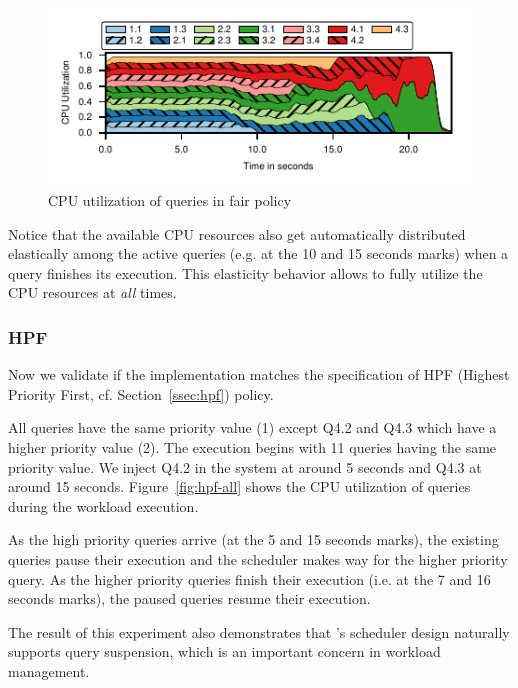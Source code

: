 \begin{figure}[t]
	\centering
	\includegraphics[width=\columnwidth]{figures/ssb-all-uniform-fair-cpu-util.pdf}
	\vspace{-2.5em}
	\caption{CPU utilization of queries in fair policy}
	\label{fig:fair-cpu-util}
\end{figure}

Notice that the available CPU resources also get automatically distributed elastically among the active queries (e.g. at the 10 and 15 seconds marks) when a query finishes its execution. 
This elasticity behavior allows \sys{} to fully utilize the CPU resources at \textit{all} times.
\subsubsection{HPF}
Now we validate if the implementation matches the 
specification of HPF (Highest Priority First, cf. Section~\ref{ssec:hpf}) policy.

All queries have the same priority value (1) except Q4.2 and Q4.3 which have a higher priority value (2). 
The execution begins with 11 queries having the same priority value. %
We inject Q4.2 in the system at around 5 seconds and Q4.3 at around 15 seconds.
Figure~\ref{fig:hpf-all} shows the CPU utilization of queries during the workload 
execution.

As the high priority queries arrive (at the 5 and 15 seconds marks), the existing queries pause their execution and the scheduler makes way for the higher priority query.
As the higher priority queries finish their execution (i.e. at the 7 and 16 seconds marks), the paused queries resume their execution.

The result of this experiment also demonstrates that \sys{}'s scheduler design naturally supports query suspension, which is an important concern in workload management. 


